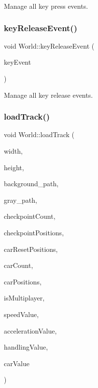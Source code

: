 Manage all key press events. 

\mbox{\label{class_world_a8b8a8bd9430e38dbaae2bd4ef0f16c92}} 
\subsubsection{\texorpdfstring{keyReleaseEvent()}{keyReleaseEvent()}}
{\footnotesize\ttfamily void World\+::key\+Release\+Event (\begin{DoxyParamCaption}\item[{Q\+Key\+Event $\ast$}]{key\+Event }\end{DoxyParamCaption})}



Manage all key release events. 

\mbox{\label{class_world_a195350846001070a93027c8f8f1ec211}} 
\subsubsection{\texorpdfstring{loadTrack()}{loadTrack()}}
{\footnotesize\ttfamily void World\+::load\+Track (\begin{DoxyParamCaption}\item[{int}]{width,  }\item[{int}]{height,  }\item[{Q\+String}]{background\+\_\+path,  }\item[{Q\+String}]{gray\+\_\+path,  }\item[{int}]{checkpoint\+Count,  }\item[{\mbox{\hyperlink{class_world_position}{World\+Position}} $\ast$}]{checkpoint\+Positions,  }\item[{\mbox{\hyperlink{class_world_position}{World\+Position}} $\ast$}]{car\+Reset\+Positions,  }\item[{int}]{car\+Count,  }\item[{\mbox{\hyperlink{class_world_position}{World\+Position}} $\ast$}]{car\+Positions,  }\item[{bool}]{is\+Multiplayer,  }\item[{int}]{speed\+Value,  }\item[{int}]{acceleration\+Value,  }\item[{int}]{handling\+Value,  }\item[{int}]{car\+Value }\end{DoxyParamCaption})}



